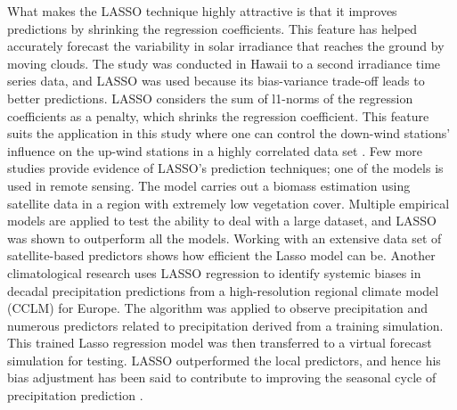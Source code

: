 What makes the LASSO technique highly attractive is that it improves predictions by shrinking the regression coefficients. This feature has helped accurately forecast the variability in solar irradiance that reaches the ground by moving clouds. The study was conducted in Hawaii to a second irradiance time series data, and LASSO was used because its bias-variance trade-off leads to better predictions. LASSO  considers the sum of l1-norms of the regression coefficients as a penalty, which shrinks the regression coefficient. This feature suits the application in this study where one can control the down-wind stations' influence on the up-wind stations in a highly correlated data set \cite{yang2015very}. Few more studies provide evidence of LASSO's prediction techniques; one of the models is used in remote sensing. The model carries out a  biomass estimation using satellite data in a region with extremely low vegetation cover. Multiple empirical models are applied to test the ability to deal with a large dataset, and LASSO was shown to outperform all the models. Working with an extensive data set of satellite-based predictors shows how efficient the Lasso model can be. Another climatological research uses LASSO regression to identify systemic biases in decadal precipitation predictions from a high-resolution regional climate model (CCLM) for Europe. The algorithm was applied to observe precipitation and numerous predictors related to precipitation derived from a training simulation. This trained Lasso regression model was then transferred to a virtual forecast simulation for testing. LASSO outperformed the local predictors, and hence his bias adjustment has been said to contribute to improving the seasonal cycle of precipitation prediction \cite{li2020comparing}.


